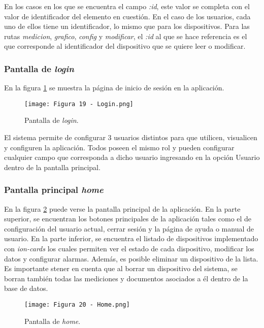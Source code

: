 En los casos en los que se encuentra el campo \textit{:id}, este valor se completa con el valor de identificador del elemento en cuestión. En el caso de los usuarios, cada uno de ellos tiene un identificador, lo mismo que para los dispositivos. Para las rutas \textit{medicion}, \textit{grafico}, \textit{config} y \textit{modificar}, el \textit{:id} al que se hace referencia es el que corresponde al identificador del dispositivo que se quiere leer o modificar.

\subsubsection{Pantalla de \textit{login}}

En la figura \ref{fig:19} se muestra la página de inicio de sesión en la aplicación.

\begin{figure}[h]
\centering
\texttt{[image: Figura 19 - Login.png]}
\caption[Pantalla login]{Pantalla de \textit{login}.}
\label{fig:19}
\end{figure}

El sistema permite de configurar 3 usuarios distintos para que utilicen, visualicen y configuren la aplicación. Todos poseen el mismo rol y pueden configurar cualquier campo que corresponda a dicho usuario ingresando en la opción Usuario dentro de la pantalla principal.

\subsubsection{Pantalla principal \textit{home}}

En la figura \ref{fig:20} puede verse la pantalla principal de la aplicación. En la parte superior, se encuentran los botones principales de la aplicación tales como el de configuración del usuario actual, cerrar sesión y la página de ayuda o manual de usuario. En la parte inferior, se encuentra el listado de dispositivos implementado con \textit{ion-cards} los cuales permiten ver el estado de cada dispositivo, modificar los datos y configurar alarmas. Además, es posible eliminar un dispositivo de la lista. Es importante stener en cuenta que al borrar un dispositivo del sistema, se borran también todas las mediciones y documentos asociados a él dentro de la base de datos.

\begin{figure}[h]
\centering
\texttt{[image: Figura 20 - Home.png]}
\caption[Pantalla home]{Pantalla de \textit{home}.}
\label{fig:20}
\end{figure}

